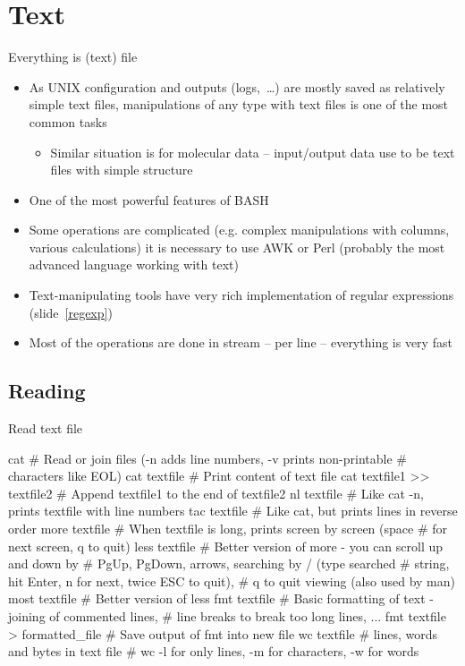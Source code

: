 \documentclass[compress, ucs, xelatex, 11pt, xcolor=svgnames,
  hyperref={
    bookmarks=true,
    unicode=true,
    colorlinks=true,
    pdftitle={Linux, command line and MetaCentrum},
    plainpages=false,
    pdfauthor={Vojtech Zeisek},
    pdfsubject={Course about use of Linux command line, writing shell scripts and using MetaCentrum of CESNET},
    pdfcreator={XeLaTeX},
    pdfkeywords={Linux, GNU, BASH, shell, command line, MetaCentrum},
    linkcolor=DarkRed,
    anchorcolor=DarkBlue,
    citecolor=Indigo,
    filecolor=NavyBlue,
    menucolor=DarkMagenta,
    urlcolor=DarkBlue,
    pdftex},
  url={hyphens, lowtilde} %
  ]{beamer}
\begin{document}
\section{Text}

\begin{frame}{Everything is (text) file}
  \begin{itemize}
    \item As UNIX configuration and outputs (logs,~\ldots) are mostly saved as relatively simple text files, manipulations of any type with text files is one of the most common tasks
    \begin{itemize}
      \item Similar situation is for molecular data -- input/output data use to be text files with simple structure
    \end{itemize}
    \item One of the most powerful features of BASH
    \item Some operations are complicated (e.g. complex manipulations with columns, various calculations) it is necessary to use AWK or Perl (probably the most advanced language working with text)
    \item Text-manipulating tools have very rich implementation of regular expressions (slide~\ref{regexp})
    \item Most of the operations are done in stream -- per line -- everything is very fast
  \end{itemize}
\end{frame}

\subsection{Reading}

\begin{frame}[fragile]{Read text file}
  \begin{bashcode}
    cat # Read or join files (-n adds line numbers, -v prints non-printable
        # characters like EOL)
    cat textfile # Print content of text file
    cat textfile1 >> textfile2 # Append textfile1 to the end of textfile2
    nl textfile # Like cat -n, prints textfile with line numbers
    tac textfile # Like cat, but prints lines in reverse order
    more textfile # When textfile is long, prints screen by screen (space
                  # for next screen, q to quit)
    less textfile # Better version of more - you can scroll up and down by
                  # PgUp, PgDown, arrows, searching by / (type searched
                  # string, hit Enter, n for next, twice ESC to quit),
                  # q to quit viewing (also used by man)
    most textfile # Better version of less
    fmt textfile # Basic formatting of text - joining of commented lines,
                 # line breaks to break too long lines, ...
    fmt textfile > formatted_file # Save output of fmt into new file
    wc textfile # lines, words and bytes in text file
                # wc -l for only lines, -m for characters, -w for words
  \end{bashcode}
\end{frame}
\end{document}
